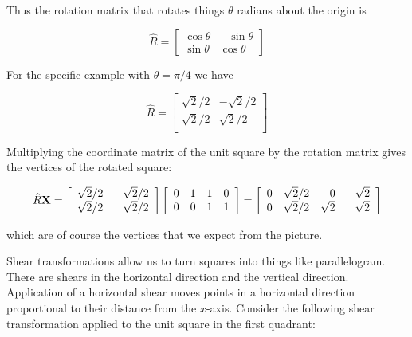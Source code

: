 \documentclass[12pt]{article}
\newcommand{\nin}{\noindent}
\newcommand{\vthree}{\vspace{3mm}}
\newcommand{\mymat}[1]{
\left[
\begin{array}{rrrrrrrrrrrrrrrrrrrrrrrrrrrrrrrrrrrrrrr}
#1
\end{array}
\right]
}
\begin{document}
\nin Thus the rotation matrix that rotates things $\theta$ radians about the origin is

\[
\hat{R} =
\mymat{
\cos\theta & -\sin\theta \\
\sin\theta & \cos\theta
}
\]

\vthree

\nin For the specific example with $\theta = \pi/4$ we have

\[
\hat{R} =
\mymat{
\sqrt{2}/2 & - \sqrt{2}/2 \\
\sqrt{2}/2 & \sqrt{2}/2 \\
}
\]

\clearpage

\nin Multiplying the coordinate matrix of the unit square by the rotation matrix gives the vertices of the rotated square:

\[
\hat{R}{\bf X} =
\mymat{
\sqrt{2}/2 & - \sqrt{2}/2 \\
\sqrt{2}/2 & \sqrt{2}/2 \\
}
\mymat{
0 & 1 & 1 & 0 \\
0 & 0 & 1 & 1 \\
} =
\mymat{
0 & \sqrt{2}/2 & 0 & -\sqrt{2} \\
0 & \sqrt{2}/2 & \sqrt{2} & \sqrt{2} \\
}
\]

\vthree

\nin which are of course the vertices  that we expect from the picture.

\vthree

\nin {\bf Shears}

\vthree

\nin Shear transformations allow us to turn squares into things like parallelogram.  There are shears in the horizontal direction and the vertical direction.  Application of a horizontal shear moves points in a horizontal direction proportional to their distance from the $x$-axis.  Consider the following shear transformation applied to the unit square in the first quadrant:

\vspace{10mm}
\end{document}
